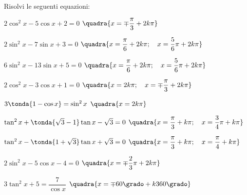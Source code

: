 
\begin{esercizio}\label{ese:03.1}
Risolvi le seguenti equazioni:
 \begin{enumeratea}
  \item \(2 \cos^2 x - 5 \cos x + 2 = 0\)
   \hfill \(\quadra{x = \mp \dfrac{\pi}{3} + 2 k \pi}\)
  \item \(2 \sin^2 x - 7 \sin x + 3 = 0\)
   \hfill \(\quadra{x = \dfrac{\pi}{6} + 2 k \pi; \quad
                   x = \dfrac{5}{6} \pi + 2 k \pi}\)
  \item \(6 \sin^2 x - 13 \sin x + 5 = 0\)
   \hfill \(\quadra{x = \dfrac{\pi}{6} + 2 k \pi; \quad
                   x = \dfrac{5}{6} \pi + 2 k \pi}\)
  \item \(2 \cos^2 x - 3 \cos x + 1 = 0\)
   \hfill \(\quadra{x = 2 k \pi; \quad 
                   x = \mp \dfrac{\pi}{3} + 2 k \pi}\)
  \item \(3 \tonda{1 - \cos x} = \sin^2 x\)
   \hfill \(\quadra{x = 2 k \pi}\)
  \item \(\tan^2 x + \tonda{\sqrt{3} - 1} \tan x - \sqrt{3} = 0\)
   \hfill \(\quadra{x = \dfrac{\pi}{3} + k \pi; \quad
                   x = \dfrac{3}{4} \pi + k \pi}\)
  \item \(\tan^2 x - \tonda{1 + \sqrt{3}} \tan x + \sqrt{3} = 0\)
   \hfill \(\quadra{x = \dfrac{\pi}{3} + k \pi; \quad
                   x = \dfrac{\pi}{4} + k \pi}\)
  \item \(2 \sin^2 x - 5 \cos x -4 = 0\)
   \hfill \(\quadra{x = \mp \dfrac{2}{3} \pi + 2 k \pi}\)
  \item \(3 \tan^2 x + 5 = \dfrac{7}{\cos x}\)
   \hfill \(\quadra{x = \mp 60 \grado + k 360 \grado}\)
 \end{enumeratea}
\end{esercizio}

\subsubsection*{}


